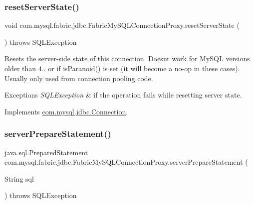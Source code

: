 \subsubsection{\texorpdfstring{reset\+Server\+State()}{resetServerState()}}
{\footnotesize\ttfamily void com.\+mysql.\+fabric.\+jdbc.\+Fabric\+My\+S\+Q\+L\+Connection\+Proxy.\+reset\+Server\+State (\begin{DoxyParamCaption}{ }\end{DoxyParamCaption}) throws S\+Q\+L\+Exception}

Resets the server-\/side state of this connection. Doesn\textquotesingle{}t work for My\+S\+QL versions older than 4.. or if is\+Paranoid() is set (it will become a no-\/op in these cases). Usually only used from connection pooling code.


\begin{DoxyExceptions}{Exceptions}
{\em S\+Q\+L\+Exception} & if the operation fails while resetting server state. \\
\hline
\end{DoxyExceptions}


Implements \mbox{\hyperlink{interfacecom_1_1mysql_1_1jdbc_1_1_connection_ac618ee80c02d7672e277b3be75304f6e}{com.\+mysql.\+jdbc.\+Connection}}.

\mbox{\label{classcom_1_1mysql_1_1fabric_1_1jdbc_1_1_fabric_my_s_q_l_connection_proxy_a1acde7226641989bf319992e99bc45f5}} 
\subsubsection{\texorpdfstring{server\+Prepare\+Statement()}{serverPrepareStatement()}\hspace{0.1cm}{\footnotesize\ttfamily [1/6]}}
{\footnotesize\ttfamily java.\+sql.\+Prepared\+Statement com.\+mysql.\+fabric.\+jdbc.\+Fabric\+My\+S\+Q\+L\+Connection\+Proxy.\+server\+Prepare\+Statement (\begin{DoxyParamCaption}\item[{String}]{sql }\end{DoxyParamCaption}) throws S\+Q\+L\+Exception}

